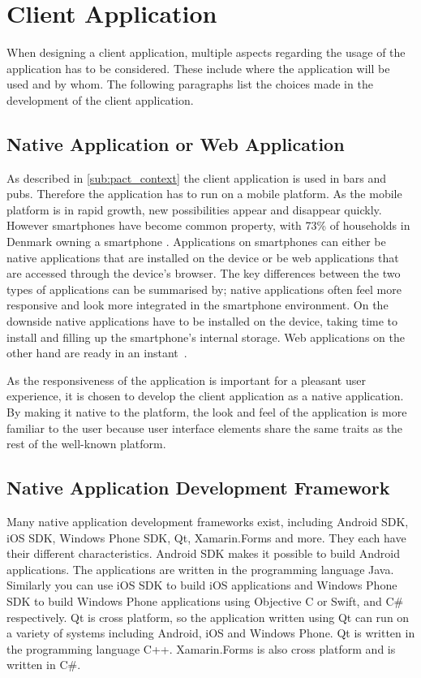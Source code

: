 \section{Client Application}
\label{ssub:client_application}

When designing a client application, multiple aspects regarding the usage of the application has to be considered. These include where the application will be used and by whom. The following paragraphs list the choices made in the development of the client application.

\subsection{Native Application or Web Application}
\label{par:native_application_or_web_application}

As described in \cref{sub:pact_context} the client application is used in bars and pubs. Therefore the application has to run on a mobile platform. As the mobile platform is in rapid growth, new possibilities appear and disappear quickly. However smartphones have become common property, with 73\% of households in Denmark owning a smartphone \cite{smartphone2014}. Applications on smartphones can either be native applications that are installed on the device or be web applications that are accessed through the device's browser. The key differences between the two types of applications can be summarised by; native applications often feel more responsive and look more integrated in the smartphone environment. On the downside native applications have to be installed on the device, taking time to install and filling up the smartphone's internal storage. Web applications on the other hand are ready in an instant~\cite{charland2011mobile}.

As the responsiveness of the application is important for a pleasant user experience, it is chosen to develop the client application as a native application. By making it native to the platform, the look and feel of the application is more familiar to the user because user interface elements share the same traits as the rest of the well-known platform.

\subsection{Native Application Development Framework}
\label{par:native_application_development_framework}

Many native application development frameworks exist, including Android SDK, iOS SDK, Windows Phone SDK, Qt, Xamarin.Forms and more. They each have their different characteristics. Android SDK makes it possible to build Android applications. The applications are written in the programming language Java. Similarly you can use iOS SDK to build iOS applications and Windows Phone SDK to build Windows Phone applications using Objective C or Swift, and C\# respectively. Qt is cross platform, so the application written using Qt can run on a variety of systems including Android, iOS and Windows Phone. Qt is written in the programming language C++. Xamarin.Forms is also cross platform and is written in C\#.

